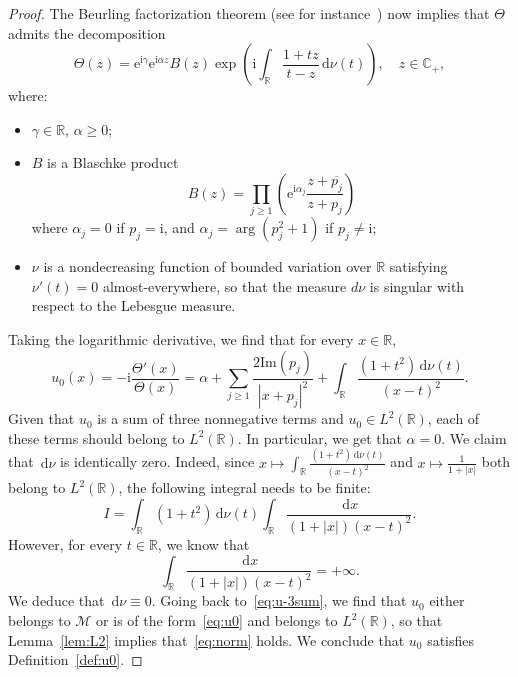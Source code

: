 \documentclass[english, 12pt]{amsart}%
\newcommand{\R}{\mathbb{R}}
\newcommand{\C}{\mathbb{C}}
\newcommand{\ii}{\mathrm{i}}
\newcommand{\dd}{\,\mathrm{d}}
\newcommand{\ee}{\mathrm{e}}
\renewcommand{\Im}{\mathrm{Im}}
\numberwithin{equation}{section}
\begin{document}
\begin{proof}
The Beurling factorization theorem  (see for instance~\cite{Duren70book}) now implies that $\Theta$ admits the decomposition
\[
\Theta(z)
	=\ee^{\ii\gamma}\ee^{\ii\alpha z}B(z)\exp\left(\ii\int_{\R}\frac{1+tz}{t-z}\dd \nu(t)\right),
	\quad z\in\C_+,
\]
where:
\begin{itemize}
\item $\gamma\in\R$,  $\alpha\geq 0$;
\item  $B$ is a Blaschke product
\[
B(z)=\prod_{j\geq 1}\left(\ee^{\ii\alpha_j}\frac{z+\overline{p_j}}{z+p_j}\right)
\]
where $\alpha_j=0$ if $p_j=\ii$, and $\alpha_j=\arg(p_j^2+1)$ if $p_j\neq \ii$;
\item $\nu$ is a nondecreasing function of bounded variation over $\R$ satisfying $\nu'(t)=0$ almost-everywhere, so that the measure $d\nu$ is singular with respect to the Lebesgue measure.
\end{itemize}
Taking the logarithmic derivative, we find that for every $x\in\R$,
\begin{equation}\label{eq:u-3sum}
u_0(x)
	=-\ii\frac{\Theta'(x)}{\Theta(x)}
	=\alpha 
	+ \sum_{j\geq 1}\frac{2\Im(p_j)}{|x+p_j|^2}
	+\int_{\R}\frac{(1+t^2)\dd\nu(t)}{(x-t)^2}.
\end{equation}
Given that $u_0$ is a sum of three nonnegative terms and $u_0\in L^2(\R)$, each of these terms should belong to $L^2(\R)$. In particular, we get that $\alpha=0$.  We claim that $\dd\nu$ is identically zero. Indeed, since $x\mapsto \int_{\R}\frac{(1+t^2)\dd\nu(t)}{(x-t)^2}$ and $x\mapsto \frac{1}{1+|x|}$ both belong to $L^2(\R)$, the following integral needs to be finite:
\[
I
	=\int_{\R}(1+t^2)\dd\nu(t)\int_{\R}\frac{\dd x}{(1+|x|)(x-t)^2}.
\]
However, for every $t\in\R$, we know that
\[
\int_{\R}\frac{\dd x}{(1+|x|)(x-t)^2}=+\infty.
\]
We deduce that $\dd\nu\equiv 0$. Going back to~\eqref{eq:u-3sum}, we find that $u_0$ either belongs to $\mathscr M$ or is of the form~\eqref{eq:u0} and belongs to $L^2(\R)$, so that Lemma~\ref{lem:L2} implies that~\eqref{eq:norm} holds. We conclude that $u_0$ satisfies Definition~\ref{def:u0}.
\end{proof}






\end{document}
